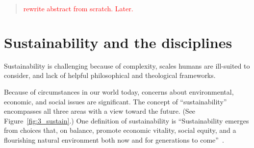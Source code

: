 \documentclass[12pt]{article}
\date{}                           %
\newcommand{\ins}[1]{\textcolor{red}{#1}}
\begin{document}
	
\maketitle

\begin{abstract}
\noindent
\ins{rewrite abstract from scratch. Later.}

\end{abstract}


\section{Sustainability and the disciplines}
\label{sec:sustainability_and_the_disciplines}

Sustainability is challenging because of complexity, scales humans are ill-suited to consider, 
and lack of helpful philosophical and theological frameworks.

Because of circumstances in our world today, 
concerns about environmental, economic, and social 
issues are significant. 
The concept of ``sustainability'' encompasses all three areas
with a view toward the future. 
(See Figure~\ref{fig:3_sustain}.)
One definition of sustainability is
``Sustainability emerges from choices that, on balance, 
promote economic vitality, social equity, and a flourishing natural environment 
both now and for generations to come''~\autocite{Calvin-College-2017}.
\end{document}
